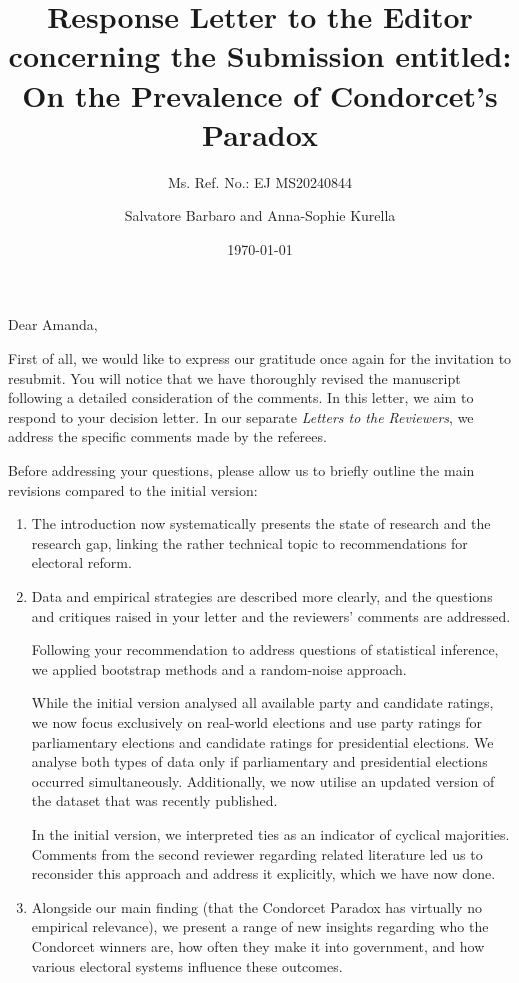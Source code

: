 \documentclass[a4paper, 12pt]{scrartcl}
\title{{\small Response Letter to the Editor concerning the Submission entitled:} \\ On the Prevalence of Condorcet's Paradox }
\subtitle{Ms. Ref. No.: EJ MS20240844}
\author{Salvatore Barbaro and Anna-Sophie Kurella}
\date{\today}
\begin{document}
\maketitle

\noindent Dear Amanda,

First of all, we would like to express our gratitude once again for the invitation to resubmit. You will notice that we have thoroughly revised the manuscript following a detailed consideration of the comments. In this letter, we aim to respond to your decision letter. In our separate \textit{Letters to the Reviewers}, we address the specific comments made by the referees.

Before addressing your questions, please allow us to briefly outline the main revisions compared to the initial version:
\begin{enumerate}
	\item The introduction now systematically presents the state of research and the research gap, linking the rather technical topic to recommendations for electoral reform.
	\item Data and empirical strategies are described more clearly, and the questions and critiques raised in your letter and the reviewers' comments are addressed.

	Following your recommendation to address questions of statistical inference, we applied bootstrap methods and a random-noise approach.
	
	While the initial version analysed all available party and candidate ratings, we now focus exclusively on real-world elections and use party ratings for parliamentary elections and candidate ratings for presidential elections. We analyse both types of data only if parliamentary and presidential elections occurred simultaneously. Additionally, we now utilise an updated version of the dataset that was recently published. 
	
	In the initial version, we interpreted ties as an indicator of cyclical majorities. Comments from the second reviewer regarding related literature led us to reconsider this approach and address it explicitly, which we have now done.
	\item Alongside our main finding (that the Condorcet Paradox has virtually no empirical relevance), we present a range of new insights regarding who the Condorcet winners are, how often they make it into government, and how various electoral systems influence these outcomes.
\end{enumerate}
\end{document}
